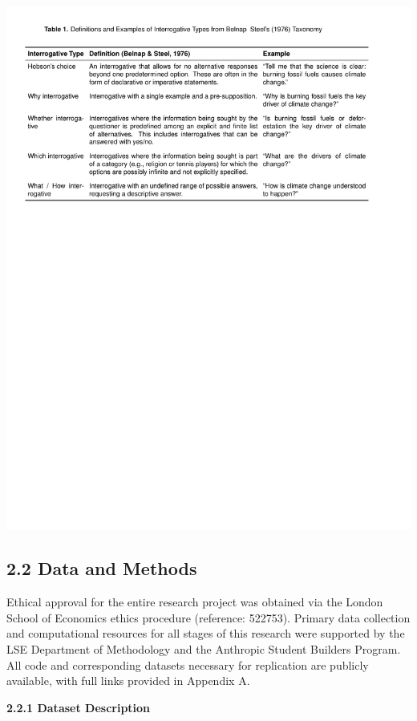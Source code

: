 \documentclass[
  12pt,
]{article}
\begin{document}
\begin{center}\includegraphics{../03_outputs/01_taxonomies_of_interrogatives/table_1} \end{center}

\subsection{2.2 Data and Methods}\label{data-and-methods}

Ethical approval for the entire research project was obtained via the London School of Economics ethics procedure (reference: 522753). Primary data collection and computational resources for all stages of this research were supported by the LSE Department of Methodology and the Anthropic Student Builders Program. All code and corresponding datasets necessary for replication are publicly available, with full links provided in Appendix A.

\textbf{2.2.1 Dataset Description}
\end{document}

